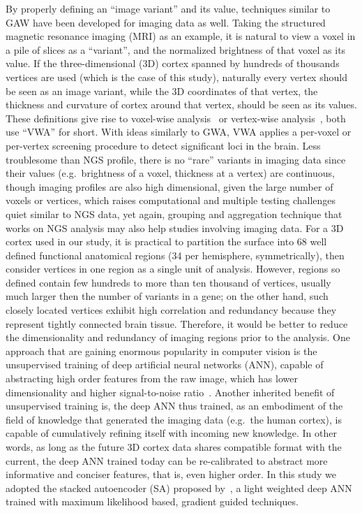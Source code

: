 By properly defining an ``image variant'' and its value, techniques similar to GAW have been developed for imaging data as well. Taking the structured magnetic resonance imaging (MRI) as an example, it is natural to view a voxel in a pile of slices as a ``variant'', and the normalized brightness of that voxel as its value. If the three-dimensional (3D) cortex spanned by hundreds of thousands vertices are used (which is the case of this study), naturally every vertex should be seen as an image variant, while the 3D coordinates of that vertex, the thickness and curvature of cortex around that vertex, should be seen as its values. These definitions give rise to voxel-wise analysis~\cite{VWA1, VWA2, VWA3, VWA4} or vertex-wise analysis~\cite{FS:Anl1, FS:Anl2}, both use ``VWA'' for short. With ideas similarly to GWA, VWA applies a per-voxel or per-vertex screening procedure to detect significant loci in the brain. Less troublesome than NGS profile, there is no ``rare'' variants in imaging data since their values (e.g.\ brightness of a voxel, thickness at a vertex) are continuous, though imaging profiles are also high dimensional, given the large number of voxels or vertices, which raises computational and multiple testing challenges quiet similar to NGS data, yet again, grouping and aggregation technique that works on NGS analysis may also help studies involving imaging data. For a 3D cortex used in our study, it is practical to partition the surface into 68 well defined functional anatomical regions (34 per hemisphere, symmetrically), then consider vertices in one region as a single unit of analysis. However, regions so defined contain few hundreds to more than ten thousand of vertices, usually much larger then the number of variants in a gene; on the other hand, such closely located vertices exhibit high correlation and redundancy because they represent tightly connected brain tissue. Therefore, it would be better to reduce the dimensionality and redundancy of imaging regions prior to the analysis. One approach that are gaining enormous popularity in computer vision is the unsupervised training of deep artificial neural networks (ANN), capable of abstracting high order features from the raw image, which has lower dimensionality and higher signal-to-noise ratio~\cite{DL:Intro1, DL:SDA1, DL:Intro2}. Another inherited benefit of unsupervised training is, the deep ANN thus trained, as an embodiment of the field of knowledge that generated the imaging data (e.g.\ the human cortex), is capable of cumulatively refining itself with incoming new knowledge. In other words, as long as the future 3D cortex data shares compatible format with the current, the deep ANN trained today can be re-calibrated to abstract more informative and conciser features, that is, even higher order. In this study we adopted the stacked autoencoder (SA) proposed by~\cite{DL:SDA1, DL:Intro2}, a light weighted deep ANN trained with maximum likelihood based, gradient guided techniques.


